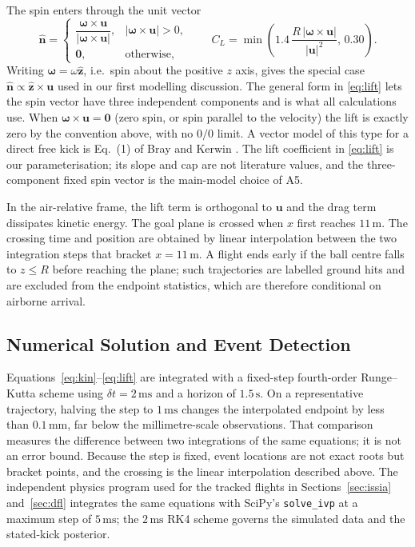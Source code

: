 \documentclass[11pt,a4paper]{article}
\begin{document}
The spin enters through the unit vector
\begin{equation}
  \hat{\mathbf{n}}=
  \begin{cases}
    \dfrac{\boldsymbol{\omega}\times\mathbf{u}}{|\boldsymbol{\omega}\times\mathbf{u}|}, & |\boldsymbol{\omega}\times\mathbf{u}|>0,\\[2mm]
    \mathbf{0}, & \text{otherwise},
  \end{cases}
  \qquad
  C_L=\min\!\left(1.4\,\frac{R\,|\boldsymbol{\omega}\times\mathbf{u}|}{|\mathbf{u}|^2},\,0.30\right).
  \label{eq:lift}
\end{equation}
Writing $\boldsymbol{\omega}=\omega\hat{\mathbf{z}}$, i.e.\ spin about the positive $z$ axis, gives the special case $\hat{\mathbf{n}}\propto\hat{\mathbf{z}}\times\mathbf{u}$ used in our first modelling discussion. The general form in \eqref{eq:lift} lets the spin vector have three independent components and is what all calculations use. When $\boldsymbol{\omega}\times\mathbf{u}=\mathbf{0}$ (zero spin, or spin parallel to the velocity) the lift is exactly zero by the convention above, with no $0/0$ limit. A vector model of this type for a direct free kick is Eq.~(1) of Bray and Kerwin \cite{bray2003}. The lift coefficient in \eqref{eq:lift} is our parameterisation; its slope and cap are not literature values, and the three-component fixed spin vector is the main-model choice of A5.

In the air-relative frame, the lift term is orthogonal to $\mathbf{u}$ and the drag term dissipates kinetic energy. The goal plane is crossed when $x$ first reaches $11\,\mathrm{m}$. The crossing time and position are obtained by linear interpolation between the two integration steps that bracket $x=11\,\mathrm{m}$. A flight ends early if the ball centre falls to $z\le R$ before reaching the plane; such trajectories are labelled ground hits and are excluded from the endpoint statistics, which are therefore conditional on airborne arrival.

\subsection{Numerical Solution and Event Detection}

Equations~\eqref{eq:kin}--\eqref{eq:lift} are integrated with a fixed-step fourth-order Runge--Kutta scheme using $\delta t=2\,\mathrm{ms}$ and a horizon of $1.5\,\mathrm{s}$. On a representative trajectory, halving the step to $1\,\mathrm{ms}$ changes the interpolated endpoint by less than $0.1\,\mathrm{mm}$, far below the millimetre-scale observations. That comparison measures the difference between two integrations of the same equations; it is not an error bound. Because the step is fixed, event locations are not exact roots but bracket points, and the crossing is the linear interpolation described above. The independent physics program used for the tracked flights in Sections~\ref{sec:issia} and~\ref{sec:dfl} integrates the same equations with SciPy's \texttt{solve\_ivp} at a maximum step of $5\,\mathrm{ms}$; the $2\,\mathrm{ms}$ RK4 scheme governs the simulated data and the stated-kick posterior.
\end{document}
